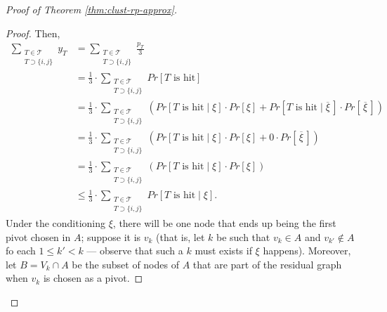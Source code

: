 \begin{proof}[Proof of Theorem \ref{thm:clust-rp-approx}]
\begin{proof}
    Then,
    \begin{align*}
        \sum_{\substack{T \in \mathcal{T}\\T \supset \{i,j\}}} y_T &= \sum_{\substack{T \in \mathcal{T}\\T \supset \{i,j\}}} \frac{p_T}3\\
        &=\frac13 \cdot \sum_{\substack{T \in \mathcal{T}\\T \supset \{i,j\}}} Pr[T \text{ is hit}]\\
        &=\frac13 \cdot \sum_{\substack{T \in \mathcal{T}\\T \supset \{i,j\}}} \left( Pr[T \text{ is hit} \mid \xi] \cdot Pr[\xi] +  Pr\left[T \text{ is hit} \mid \overline{\xi}\,\right] \cdot Pr\left[\,\overline{\xi}\,\right]\right)\\
        &=\frac13 \cdot \sum_{\substack{T \in \mathcal{T}\\T \supset \{i,j\}}} \left( Pr[T \text{ is hit} \mid \xi] \cdot Pr[\xi] +  0 \cdot Pr\left[\,\overline{\xi}\,\right]\right)\\
        &=\frac13 \cdot \sum_{\substack{T \in \mathcal{T}\\T \supset \{i,j\}}} \left( Pr[T \text{ is hit} \mid \xi] \cdot Pr[\xi]\right)\\
        &\le \frac13 \cdot \sum_{\substack{T \in \mathcal{T}\\T \supset \{i,j\}}}  Pr[T \text{ is hit} \mid \xi].
    \end{align*}
    Under the conditioning $\xi$, there will be one node that ends up being the first  pivot chosen in $A$; suppose it is $v_k$ (that is, let $k$ be such that $v_k \in A$ and $v_{k'} \not\in A$ fo each $1 \le k' < k$ --- observe that such a $k$ must exists if $\xi$ happens).
    Moreover, let $B = V_k \cap A$ be the subset of nodes of $A$ that are part of the residual graph when $v_k$ is chosen as a pivot.


\end{proof}
\end{proof}
